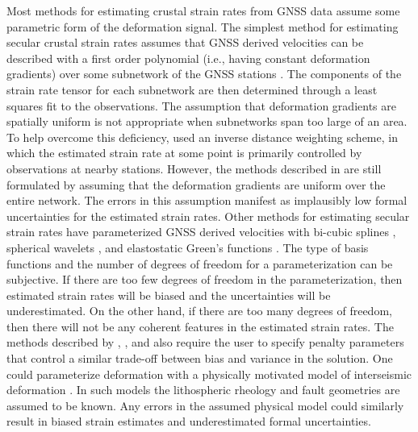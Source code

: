 \documentclass[extra,mreferee]{gji}
\begin{document}
Most methods for estimating crustal strain rates from GNSS data assume some parametric form of the deformation signal. The simplest method for estimating secular crustal strain rates assumes that GNSS derived velocities can be described with a first order polynomial (i.e., having constant deformation gradients) over some subnetwork of the GNSS stations \citep[e.g.,][]{Feigl1990,Murray2000}. The components of the strain rate tensor  for each subnetwork are then determined through a least squares fit to the observations. The assumption that deformation gradients are spatially uniform is not appropriate when subnetworks span too large of an area. To help overcome this deficiency, \citet{Shen1996,Shen2015} used an inverse distance weighting scheme, in which the estimated strain rate at some point is primarily controlled by observations at nearby stations. However, the methods described in \citet{Shen1996,Shen2015} are still formulated by assuming that the deformation gradients are uniform over the entire network. The errors in this assumption manifest as implausibly low formal uncertainties for the estimated strain rates. Other methods for estimating secular strain rates have parameterized GNSS derived velocities with bi-cubic splines \citep{Beavan2001}, spherical wavelets \citep{Tape2009}, and elastostatic Green's functions \citep{Sandwell2016}. The type of basis functions and the number of degrees of freedom for a parameterization can be subjective. If there are too few degrees of freedom in the parameterization, then estimated strain rates will be biased and the uncertainties will be underestimated. On the other hand, if there are too many degrees of freedom, then there will not be any coherent features in the estimated strain rates. The methods described by \citet{Beavan2001}, \citet{Tape2009}, and \citet{Sandwell2016} also require the user to specify penalty parameters that control a similar trade-off between bias and variance in the solution. One could parameterize deformation with a physically motivated model of interseismic deformation \citep[e.g.,][]{Meade2005,McCaffrey2007}. In such models the lithospheric rheology and fault geometries are assumed to be known. Any errors in the assumed physical model could similarly result in biased strain estimates and underestimated formal uncertainties. 
\end{document}
